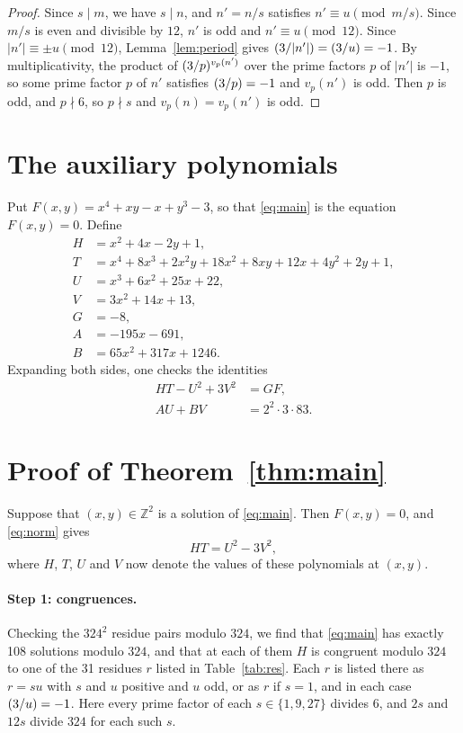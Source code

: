 \documentclass[11pt]{article}
\newcommand{\Z}{\mathbb{Z}}
\newcommand{\leg}[2]{\mathchoice{\biggl(\dfrac{#1}{#2}\biggr)}{(#1/#2)}{(#1/#2)}{(#1/#2)}}
\begin{document}
\begin{proof}
Since $s\mid m$, we have $s\mid n$, and $n'=n/s$ satisfies $n'\equiv u\pmod{m/s}$. Since $m/s$ is even and divisible by $12$, $n'$ is odd and $n'\equiv u\pmod{12}$. Since $|n'|\equiv\pm u\pmod{12}$, Lemma~\ref{lem:period} gives $\leg{3}{|n'|}=\leg{3}{u}=-1$. By multiplicativity, the product of $\leg{3}{p}^{v_p(n')}$ over the prime factors $p$ of $|n'|$ is $-1$, so some prime factor $p$ of $n'$ satisfies $\leg{3}{p}=-1$ and $v_p(n')$ is odd. Then $p$ is odd, and $p\nmid6$, so $p\nmid s$ and $v_p(n)=v_p(n')$ is odd.
\end{proof}

\section{The auxiliary polynomials}

Put $F(x,y)=x^{4}+xy-x+y^{3}-3$, so that \eqref{eq:main} is the equation $F(x,y)=0$. Define
\begin{align*}
H&=x^{2}+4x-2y+1,\\
T&=x^{4}+8x^{3}+2x^{2}y+18x^{2}+8xy+12x+4y^{2}+2y+1,\\
U&=x^{3}+6x^{2}+25x+22,\\
V&=3x^{2}+14x+13,\\
G&=-8,\\
A&=-195x-691,\\
B&=65x^{2}+317x+1246.
\end{align*}
Expanding both sides, one checks the identities
\begin{align}
HT-U^2+3V^2&=GF,\label{eq:norm}\\
AU+BV&=2^{2}\cdot 3\cdot 83.\label{eq:bezout}
\end{align}

\section{Proof of Theorem~\ref{thm:main}}

Suppose that $(x,y)\in\Z^2$ is a solution of \eqref{eq:main}. Then $F(x,y)=0$, and \eqref{eq:norm} gives
\begin{equation}\label{eq:HT}
HT=U^2-3V^2,
\end{equation}
where $H$, $T$, $U$ and $V$ now denote the values of these polynomials at $(x,y)$.

\paragraph{Step 1: congruences.} Checking the $324^2$ residue pairs modulo $324$, we find that \eqref{eq:main} has exactly 108 solutions modulo $324$, and that at each of them $H$ is congruent modulo $324$ to one of the 31 residues $r$ listed in Table~\ref{tab:res}. Each $r$ is listed there as $r=su$ with $s$ and $u$ positive and $u$ odd, or as $r$ if $s=1$, and in each case $\leg{3}{u}=-1$. Here every prime factor of each $s\in\{1,9,27\}$ divides $6$, and $2s$ and $12s$ divide $324$ for each such $s$.
\end{document}
